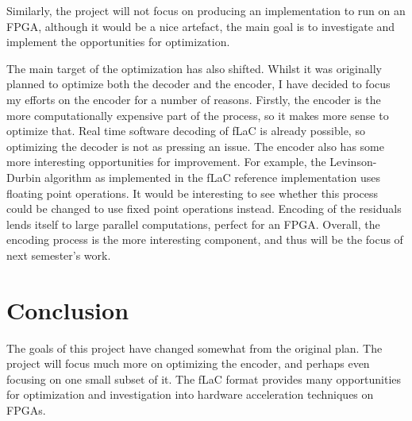 \documentclass[12pt]{scrartcl}
\begin{document}
  Similarly, the project will not focus on producing an implementation to run on an FPGA, although it would be a nice artefact, the main goal is to investigate and implement the opportunities for optimization.
      
  The main target of the optimization has also shifted. Whilst it was originally planned to optimize both the decoder and the encoder, I have decided to focus my efforts on the encoder for a number of reasons. Firstly, the encoder is the more computationally expensive part of the process, so it makes more sense to optimize that. Real time software decoding of fLaC is already possible, so optimizing the decoder is not as pressing an issue. The encoder also has some more interesting opportunities for improvement. For example, the Levinson-Durbin algorithm as implemented in the fLaC reference implementation uses floating point operations. It would be interesting to see whether this process could be changed to use fixed point operations instead. Encoding of the residuals lends itself to large parallel computations, perfect for an FPGA. Overall, the encoding process is the more interesting component, and thus will be the focus of next semester's work.
  
  \section{Conclusion}
  The goals of this project have changed somewhat from the original plan. The project will focus much more on optimizing the encoder, and perhaps even focusing on one small subset of it. The fLaC format provides many opportunities for optimization and investigation into hardware acceleration techniques on FPGAs.
  
  
  
\end{document}
